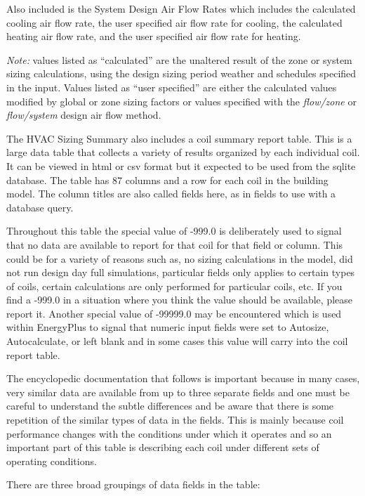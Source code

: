 Also included is the System Design Air Flow Rates which includes the calculated cooling air flow rate, the user specified air flow rate for cooling, the calculated heating air flow rate, and the user specified air flow rate for heating.

\emph{Note:} values listed as ``calculated'' are the unaltered result of the zone or system sizing calculations, using the design sizing period weather and schedules specified in the input. Values listed as ``user specified'' are either the calculated values modified by global or zone sizing factors or values specified with the \emph{flow/zone} or \emph{flow/system} design air flow method.

The HVAC Sizing Summary also includes a coil summary report table. This is a large data table that collects a variety of results organized by each individual coil.  It can be viewed in html or csv format but it expected to be used from the sqlite database.  The table has 87 columns and a row for each coil in the building model.  The column titles are also called fields here, as in fields to use with a database query.

Throughout this table the special value of -999.0 is deliberately used to signal that no data are available to report for that coil for that field or column.  This could be for a variety of reasons such as, no sizing calculations in the model, did not run design day full simulations, particular fields only applies to certain types of coils, certain calculations are only performed for particular coils, etc.  If you find a -999.0 in a situation where you think the value should be available, please report it.  Another special value of -99999.0 may be encountered which is used within EnergyPlus to signal that numeric input fields were set to Autosize, Autocalculate, or left blank and in some cases this value will carry into the coil report table.

The encyclopedic documentation that follows is important because in many cases, very similar data are available from up to three separate fields and one must be careful to understand the subtle differences and be aware that there is some repetition of the similar types of data in the fields.  This is mainly because coil performance changes with the conditions under which it operates and so an important part of this table is describing each coil under different sets of operating conditions.

There are three broad groupings of data fields in the table:

